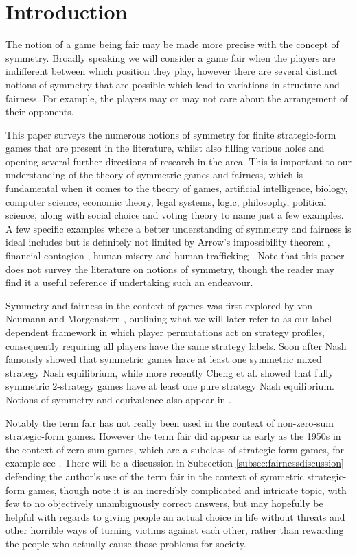 \section{Introduction} \label{sec:intro}
The notion of a game being fair may be made more precise with the concept of symmetry. Broadly speaking we will consider a game fair when the players are indifferent between which position they play, however there are several distinct notions of symmetry that are possible which lead to variations in structure and fairness. For example, the players may or may not care about the arrangement of their opponents. 

This paper surveys the numerous notions of symmetry for finite strategic-form games that are present in the literature, whilst also filling various holes and opening several further directions of research in the area. This is important to our understanding of the theory of symmetric games and fairness, which is fundamental when it comes to the theory of games, artificial intelligence, biology, computer science, economic theory, legal systems, logic, philosophy, political science, along with social choice and voting theory to name just a few examples. A few specific examples where a better understanding of symmetry and fairness is ideal includes but is definitely not limited by Arrow's impossibility theorem \cite{arrow1950difficulty, arrow2012social}, financial contagion \cite{dungey2005contagion}, human misery \cite{margolis2003misery} and human trafficking \cite{aronowitz2009human}. Note that this paper does not survey the literature on notions of symmetry, though the reader may find it a useful reference if undertaking such an endeavour. 



Symmetry and fairness in the context of games was first explored by von Neumann and Morgenstern \cite{VNM}, outlining what we will later refer to as our label-dependent framework in which player permutations act on strategy profiles, consequently requiring all players have the same strategy labels. Soon after Nash \cite{NashNCG} famously showed that symmetric games have at least one symmetric mixed strategy Nash equilibrium, while more recently Cheng et al. \cite{CRVWSym} showed that fully symmetric $2$-strategy games have at least one pure strategy Nash equilibrium. Notions of symmetry and equivalence also appear in \cite{HarsanyiSelten}.

Notably the term fair has not really been used in the context of non-zero-sum strategic-form games. However the term fair did appear as early as the 1950s in the context of zero-sum games, which are a subclass of strategic-form games, for example see \cite{VNM, gelbaum1959symmetric, tucker1962comb}. There will be a discussion in Subsection \ref{subsec:fairnessdiscussion} defending the author's use of the term fair in the context of symmetric strategic-form games, though note it is an incredibly complicated and intricate topic, with few to no objectively unambiguously correct answers, but may hopefully be helpful with regards to giving people an actual choice in life without threats and other horrible ways of turning victims against each other, rather than rewarding the people who actually cause those problems for society.

